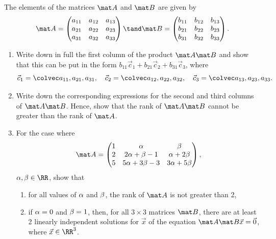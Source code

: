 \begin{problem}
    The elements of the matrices $\mat A$ and $\mat B$ are given by \[\mat A = \begin{pmatrix}a_{11} & a_{12} & a_{13} \\ a_{21} & a_{22} & a_{23} \\ a_{31} & a_{32} & a_{33}\end{pmatrix} \tand \mat B = \begin{pmatrix}b_{11} & b_{12} & b_{13} \\ b_{21} & b_{22} & b_{23} \\ b_{31} & b_{32} & b_{33}\end{pmatrix}.\]

    \begin{enumerate}
        \item Write down in full the first column of the product $\mat A \mat B$ and show that this can be put in the form $b_{11} \vec c_1 + b_{21} \vec c_2 + b_{31} \vec c_3$, where \[\vec c_1 = \cveciii{a_{11}}{a_{21}}{a_{31}}, \quad \vec c_2 = \cveciii{a_{12}}{a_{22}}{a_{32}}, \quad \vec c_3 = \cveciii{a_{13}}{a_{23}}{a_{33}}.\]
        \item Write down the corresponding expressions for the second and third columns of $\mat A \mat B$. Hence, show that the rank of $\mat A \mat B$ cannot be greater than the rank of $\mat A$.
        \item For the case where \[\mat A = \begin{pmatrix}1 & \a & \b \\ 2 & 2\a + \b - 1 & \a + 2 \b \\ 5 & 5\a + 3\b - 3 & 3\a + 5\b \end{pmatrix},\] $\a, \b \in \RR$, show that
        \begin{enumerate}
            \item for all values of $\alpha$ and $\beta$, the rank of $\mat A$ is not greater than 2,
            \item if $\alpha = 0$ and $\beta = 1$, then, for all $3 \times 3$ matrices $\mat B$, there are at least 2 linearly independent solutions for $\vec x$ of the equation $\mat A \mat B \vec x = \vec 0$, where $\vec x \in \RR^3$.
        \end{enumerate}
    \end{enumerate}
\end{problem}
